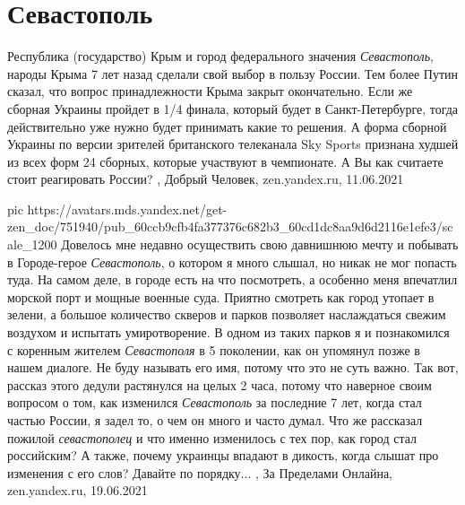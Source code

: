  
 
 
 
 
\chapter{Севастополь}
\label{sec:slova.sevastopol}

Республика (государство) Крым и город федерального значения \emph{Севастополь},
народы Крыма 7 лет назад сделали свой выбор в пользу России. Тем более Путин
сказал, что вопрос принадлежности Крыма закрыт окончательно. Если же сборная
Украины пройдет в 1/4 финала, который будет в Санкт-Петербурге, тогда
действительно уже нужно будет принимать какие то решения. А форма сборной
Украины по версии зрителей британского телеканала Sky Sports признана худшей из
всех форм 24 сборных, которые участвуют в чемпионате. А Вы как считаете стоит
реагировать России?
, 
Добрый Человек, zen.yandex.ru, 11.06.2021

\ifcmt
  pic https://avatars.mds.yandex.net/get-zen_doc/751940/pub_60ccb9cfb4fa377376c682b3_60cd1dc8aa9d6d2116e1efe3/scale_1200
\fi
Довелось мне недавно осуществить свою давнишнюю мечту и побывать в Городе-герое
\emph{Севастополь}, о котором я много слышал, но никак не мог попасть туда. На самом
деле, в городе есть на что посмотреть, а особенно меня впечатлил морской порт и
мощные военные суда. Приятно смотреть как город утопает в зелени, а большое
количество скверов и парков позволяет наслаждаться свежим воздухом и испытать
умиротворение.  В одном из таких парков я и познакомился с коренным жителем
\emph{Севастополя} в 5 поколении, как он упомянул позже в нашем диалоге. Не
буду называть его имя, потому что это не суть важно. Так вот, рассказ этого
дедули растянулся на целых 2 часа, потому что наверное своим вопросом о том,
как изменился \emph{Севастополь} за последние 7 лет, когда стал частью России, я задел
то, о чем он много и часто думал. Что же рассказал пожилой \emph{севастополец} и что
именно изменилось с тех пор, как город стал российским? А также, почему
украинцы впадают в дикость, когда слышат про изменения с его слов? Давайте по
порядку...
, 
За Пределами Онлайна, zen.yandex.ru, 19.06.2021


